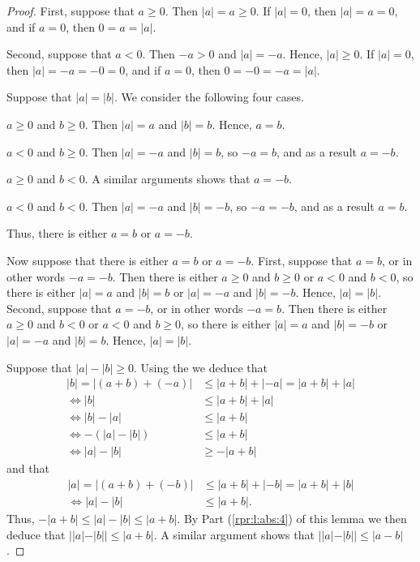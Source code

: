 \begin{proof}
	\hfill

	First, suppose that $a \geq 0$. Then $|a| = a \geq 0$. If $|a| = 0$, then $|a| = a = 0$, and if $a = 0$, then $0 = a = |a|$.

	Second, suppose that $a < 0$. Then $-a > 0$ and $|a| = -a$. Hence, $|a| \geq 0$. If $|a| = 0$, then $|a| = -a = -0 = 0$, and if $a = 0$, then $0 = -0 = -a = |a|$.

	Suppose that $|a| = |b|$. We consider the following four cases.
	\begin{bycases}
		\item $a \geq 0$ and $b \geq 0$. Then $|a| = a$ and $|b| = b$. Hence, $a = b$.
		\item $a < 0$ and $b \geq 0$. Then $|a| = -a$ and $|b| = b$, so $-a = b$, and as a result $a = -b$.
		\item $a \geq 0$ and $b < 0$. A similar arguments shows that $a = -b$.
		\item $a < 0$ and $b < 0$. Then $|a| = -a$ and $|b| = -b$, so $-a = -b$, and as a result $a = b$.
	\end{bycases}
	Thus, there is either $a = b$ or $a = -b$.

	Now suppose that there is either $a = b$ or $a = -b$. First, suppose that $a = b$, or in other words $-a = -b$. Then there is either $a \geq 0$ and $b \geq 0$ or $a < 0$ and $b < 0$, so there is either $|a| = a$ and $|b| = b$ or $|a| = -a$ and $|b| = -b$. Hence, $|a| = |b|$. Second, suppose that $a = -b$, or in other words $-a = b$. Then there is either $a \geq 0$ and $b < 0$ or $a < 0$ and $b \geq 0$, so there is either $|a| = a$ and $|b| = -b$ or $|a| = -a$ and $|b| = b$. Hence, $|a| = |b|$.

	Suppose that $|a| - |b| \geq 0$. Using the  we deduce that
	\begin{align*}
		|b| = |(a + b) + (-a)| & \leq |a + b| + |-a| = |a + b| + |a| \\
		\iff |b|               & \leq |a + b| + |a|                  \\
		\iff |b| - |a|         & \leq |a + b|                        \\
		\iff -(|a| - |b|)      & \leq |a + b|                        \\
		\iff |a| - |b|         & \geq -|a + b|
	\end{align*}
	and that
	\begin{align*}
		|a| = |(a + b) + (-b)| & \leq |a + b| + |-b| = |a + b| + |b| \\
		\iff |a| - |b|         & \leq |a + b|.
	\end{align*}
	Thus, $-|a + b| \leq |a| - |b| \leq |a + b|$. By Part (\ref{rpr:l:abs:4}) of this lemma we then deduce that ${||a| - |b|| \leq |a + b|}$. A similar argument shows that $||a| - |b|| \leq |a - b|$.
\end{proof}


